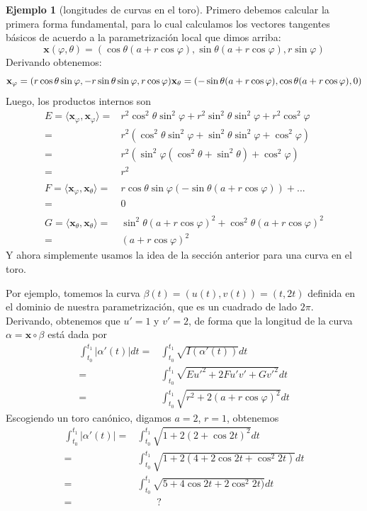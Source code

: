 \documentclass[spanish]{book}
\theoremstyle{definition}
\newtheorem*{ejem}{Ejemplo}
\begin{document}
\begin{ejem}[longitudes de curvas en el toro]
	Primero debemos calcular la primera forma fundamental, para lo cual calculamos los vectores tangentes básicos de acuerdo a la parametrización local que dimos arriba:
	\[\mathbf{x}(\varphi,\theta)=(\cos\theta(a+r\cos{\varphi}),\sin\theta(a+r\cos\varphi),r\sin\varphi)\]
	Derivando obtenemos:
	\[\mathbf{x}_\varphi=(r\cos{\theta}\sin{\varphi},-r\sin{\theta}\sin{\varphi},r\cos{\varphi})\\
	\mathbf{x}_\theta=(-\sin{\theta}(a+r\cos{\varphi}),\cos{\theta}(a+r\cos{\varphi}),0)\]
	Luego, los productos internos son
	\begin{align*}
		E=\langle\mathbf{x}_\varphi,\mathbf{x}_\varphi\rangle=&r^2\cos^2{\theta}\sin^2{\varphi}+r^2\sin^2{\theta}\sin^2{\varphi}+r^2\cos^2{\varphi}\\
		=&r^2(\cos^2{\theta}\sin^2{\varphi}+\sin^2{\theta}\sin^2{\varphi}+\cos^2{\varphi})\\
		=&r^2(\sin^2{\varphi}(\cos^2{\theta}+\sin^2{\theta})+\cos^2{\varphi})\\
		=&r^2\\\\
		F=\langle\mathbf{x}_\varphi,\mathbf{x}_\theta\rangle=&r\cos{\theta}\sin{\varphi}(-\sin{\theta}(a+r\cos{\varphi}))+...\\=&0\\\\
		G=\langle\mathbf{x}_\theta,\mathbf{x}_\theta\rangle=&\sin^2\theta(a+r\cos{\varphi})^2+\cos^2{\theta}(a+r\cos{\varphi})^2\\
		=&(a+r\cos{\varphi})^2
	\end{align*}
	Y ahora simplemente usamos la idea de la sección anterior para una curva en el toro.
	
	Por ejemplo, tomemos la curva $\beta(t)=(u(t),v(t))=(t,2t)$ definida en el dominio de nuestra parametrización, que es un cuadrado de lado $2\pi$. Derivando, obtenemos que $u'=1$ y $v'=2$, de forma que  la longitud de la curva $\alpha=\mathbf{x}\circ\beta$ está dada por
	\begin{align*}
		\int_{t_0}^{t_1}|\alpha'(t)|dt=&\int_{t_0}^{t_1}\sqrt{I(\alpha'(t))}dt\\
		=&\int_{t_0}^{t_1}\sqrt{Eu'^2+2Fu'v'+Gv'^2}dt\\
		=&\int_{t_0}^{t_1}\sqrt{r^2+2(a+r\cos{\varphi})^2}dt
	\end{align*}
	Escogiendo un toro canónico, digamos $a=2$, $r=1$, obtenemos
	\begin{align*}
		\int_{t_0}^{t_1}|\alpha'(t)|=&\int_{t_0}^{t_1}\sqrt{1+2(2+\cos{2t})^2}dt\\
		=&\int_{t_0}^{t_1}\sqrt{1+2(4+2\cos{2t}+\cos^2{2t})}dt\\
		=&\int_{t_0}^{t_1}\sqrt{5+4\cos{2t}+2\cos^2{2t})}dt\\
		=&\qquad?
	\end{align*}
\end{ejem}
\end{document}
